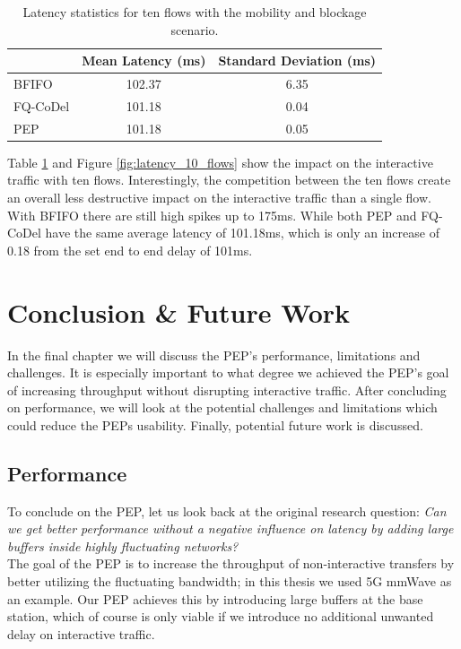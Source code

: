 \documentclass[a4paper,english, 12pt]{report}
\begin{document}
\begin{table}[h!]
\centering
\begin{tabular}{l|c|c}
\hline
 & \textbf{Mean Latency (ms)} & \textbf{Standard Deviation (ms)} \\
\hline
BFIFO   & 102.37 & 6.35 \\
FQ-CoDel  &  101.18 & 0.04 \\
PEP  &  101.18 & 0.05 \\
\end{tabular}
\caption{Latency statistics for ten flows with the mobility and blockage scenario.}
\label{tab:latency_10_flows}
\end{table}

Table \ref{tab:latency_10_flows} and Figure \ref{fig:latency_10_flows} show the impact on the interactive traffic with ten flows. Interestingly, the competition between the ten flows create an overall less destructive impact on the interactive traffic than a single flow. With BFIFO there are still high spikes up to 175ms. While both PEP and FQ-CoDel have the same average latency of 101.18ms, which is only an increase of 0.18 from the set end to end delay of 101ms.\\

\chapter{Conclusion \& Future Work}
In the final chapter we will discuss the PEP's performance, limitations and challenges. It is especially important to what degree we achieved the PEP's goal of increasing throughput without disrupting interactive traffic. After concluding on performance, we will look at the potential challenges and limitations which could reduce the PEPs usability. Finally, potential future work is discussed.\\

\section{Performance}
To conclude on the PEP, let us look back at the original research question: \textit{Can we get better performance without a negative influence on latency by adding large buffers inside highly fluctuating networks?}\\

The goal of the PEP is to increase the throughput of non-interactive transfers by better utilizing the fluctuating bandwidth; in this thesis we used 5G mmWave as an example. Our PEP achieves this by introducing large buffers at the base station, which of course is only viable if we introduce no additional unwanted delay on interactive traffic.\\
\end{document}
